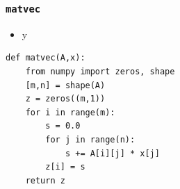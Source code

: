 \documentclass[10pt,
               svgnames,
               hyperref={colorlinks,citecolor=DeepPink4,linkcolor=FireBrick,urlcolor=Maroon},
               usepdftitle=false]{beamer}
\begin{document}
\begin{frame}[fragile]
\frametitle{\texttt{matvec}}
\begin{itemize}
\item y
\end{itemize}
\begin{center}
\begin{minipage}{0.7\textwidth}
\begin{verbatim}
def matvec(A,x):
    from numpy import zeros, shape
    [m,n] = shape(A)
    z = zeros((m,1))
    for i in range(m):
        s = 0.0
        for j in range(n):
            s += A[i][j] * x[j]
        z[i] = s
    return z
\end{verbatim}
\end{minipage}
\end{center}
\end{frame}
\end{document}
